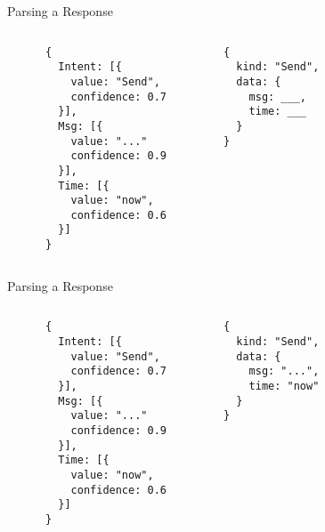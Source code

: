 \documentclass[10pt]{beamer}
\begin{document}
\begin{frame}[fragile]{Parsing a Response}

  \begin{columns}
    \begin{center}
      \begin{verbatim}
      {
        Intent: [{
          value: "Send",
          confidence: 0.7
        }],
        Msg: [{
          value: "..."
          confidence: 0.9
        }],
        Time: [{
          value: "now",
          confidence: 0.6
        }]
      }
      \end{verbatim}
    \end{center}

    \begin{center}
      \begin{verbatim}
      {
        kind: "Send",
        data: {
          msg: ___,
          time: ___
        }
      }
      \end{verbatim}
    \end{center}

  \end{columns}
\end{frame}

\begin{frame}[fragile]{Parsing a Response}

  \begin{columns}
    \begin{center}
      \begin{verbatim}
      {
        Intent: [{
          value: "Send",
          confidence: 0.7
        }],
        Msg: [{
          value: "..."
          confidence: 0.9
        }],
        Time: [{
          value: "now",
          confidence: 0.6
        }]
      }
      \end{verbatim}
    \end{center}

    \begin{center}
      \begin{verbatim}
      {
        kind: "Send",
        data: {
          msg: "...",
          time: "now"
        }
      }
      \end{verbatim}
    \end{center}

  \end{columns}
\end{frame}
\end{document}
